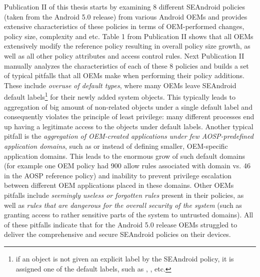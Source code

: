 Publication II of this thesis starts by examining 8 different SEAndroid policies (taken from the Android 5.0 release) from various Android OEMs and provides extensive characteristics of these policies in terms of OEM-performed changes, policy size, complexity and etc. Table 1 from Publication II shows that all OEMs extensively modify the reference policy resulting in overall policy size growth, as well as all other policy attributes and access control rules. Next Publication II manually analyzes the characteristics of each of these 8 policies and builds a set of typical pitfalls that all OEMs make when performing their policy additions. These include \textit{overuse of default types}, where many OEMs leave SEAndroid default labels\footnote{if an object is not given an explicit label by the SEAndroid policy, it is assigned one of the default labels, such as , ,  etc.} for their newly added system objects. This typically leads to aggregation of big amount of non-related objects under a single default label and consequently violates the principle of least privilege: many different processes end up having a legitimate access to the objects under default labels. Another typical pitfall is the \textit{aggregation of OEM-created applications under few AOSP-predefined application domains}, such as  or  instead of defining smaller, OEM-specific application domains. This leads to the enormous grow of such default domains (for example one OEM policy had 900 allow rules associated with  domain vs. 46 in the AOSP reference policy) and inability to prevent privilege escalation between different OEM applications placed in these domains. Other OEMs pitfalls include \textit{seemingly useless or forgotten rules} present in their policies, as well as \textit{rules that are dangerous for the overall security of the system} (such as granting access to rather sensitive parts of the system to untrusted domains). All of these pitfalls indicate that for the Android 5.0 release OEMs struggled to deliver the comprehensive and secure SEAndroid policies on their devices. 

